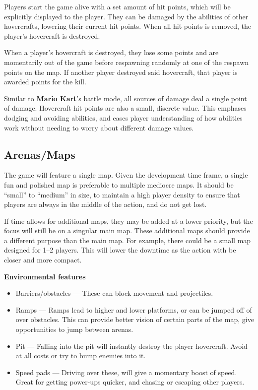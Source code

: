 \documentclass{article}
\theoremstyle{definition}
\begin{document}
Players start the game alive with a set amount of hit points, which will be
explicitly displayed to the player. They can be damaged by the abilities of
other hovercrafts, lowering their current hit points. When all hit points is
removed, the player's hovercraft is destroyed.

When a player's hovercraft is destroyed, they lose some points and are
momentarily out of the game before respawning randomly at one of the respawn
points on the map. If another player destroyed said hovercraft, that player is
awarded points for the kill.

Similar to \textbf{Mario Kart}'s battle mode, all sources of damage deal
a single point of damage. Hovercraft hit points are also a small, discrete
value. This emphases dodging and avoiding abilities, and eases player
understanding of how abilities work without needing to worry about different
damage values.

\subsection{Arenas/Maps}

The game will feature a single map. Given the development time frame, a single
fun and polished map is preferable to multiple mediocre maps. It should be
``small'' to ``medium'' in size, to maintain a high player density to ensure
that players are always in the middle of the action, and do not get lost.


If time allows for additional maps, they may be added at a lower priority, but
the focus will still be on a singular main map. These additional maps should
provide a different purpose than the main map. For example, there could be
a small map designed for 1--2 players. This will lower the downtime as the
action with be closer and more compact.

\textbf{Environmental features}

\begin{itemize}
  \item Barriers/obstacles --- These can block movement and projectiles.
  \item Ramps --- Ramps lead to higher and lower platforms, or can be jumped
    off of over obstacles. This can provide better vision of certain parts of
    the map, give opportunities to jump between arenas.
  \item Pit --- Falling into the pit will instantly destroy the player
    hovercraft. Avoid at all costs or try to bump enemies into it.
  \item Speed pads --- Driving over these, will give a momentary boost of
    speed. Great for getting power-ups quicker, and chasing or escaping other
    players.
\end{itemize}
\end{document}
